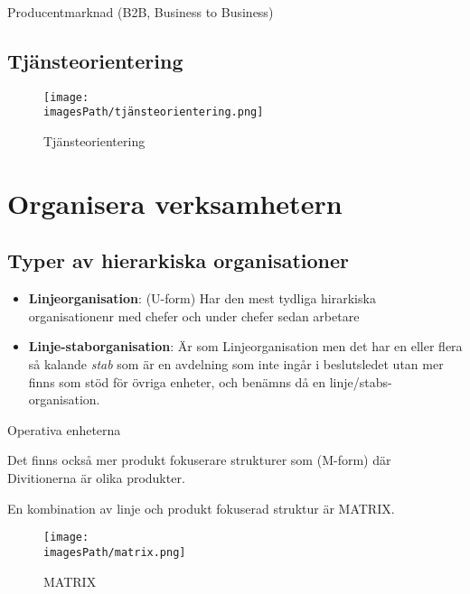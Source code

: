 Producentmarknad (B2B, Business to Business)

\subsection{Tjänsteorientering}
\begin{figure}[!h]
    \centering
    \texttt{[image: \\imagesPath/tjänsteorientering.png]}
    \caption{Tjänsteorientering}
\end{figure}


\section{Organisera verksamhetern}
\subsection{Typer av hierarkiska organisationer}
\begin{itemize}
    \item \textbf{Linjeorganisation}: (U-form) \newline
    Har den mest tydliga hirarkiska organisationenr med chefer och under chefer sedan arbetare
    \item \textbf{Linje-staborganisation}: \newline
    Är som Linjeorganisation men det har en eller flera så kalande \textit{stab} som 
    är en avdelning som inte ingår i beslutsledet utan mer finns som stöd för övriga enheter, och benämns
    då en linje/stabs-organisation.
\end{itemize}
Operativa enheterna

Det finns också mer produkt fokuserare strukturer som (M-form)
där Divitionerna är olika produkter.

En kombination av linje och produkt fokuserad struktur är MATRIX.
\begin{figure}[!h]
    \centering
    \texttt{[image: \\imagesPath/matrix.png]}
    \caption{MATRIX}
\end{figure}



